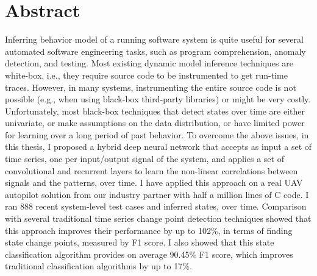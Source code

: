 
\chapter{Abstract}
Inferring behavior model of a running software system is quite useful for several automated software engineering tasks, such as program comprehension, anomaly detection, and testing. Most existing dynamic model inference techniques are white-box, i.e., they require source code to be instrumented to get run-time traces. However, in many systems, instrumenting the entire source code is not possible (e.g., when using black-box third-party libraries) or might be very costly. %
Unfortunately, most black-box techniques that detect states over time are either univariate, or make assumptions on the data distribution, or have limited power for learning over a long period of past behavior. 
To overcome the above issues, in this thesis, I proposed a hybrid deep neural network that accepts as input a set of time series, one per input/output signal of the system, and applies a set of convolutional and recurrent layers to learn the non-linear correlations between signals and the patterns, over time. 
I have applied this approach on a real UAV autopilot solution from our industry partner with half a million lines of C code. 
I ran 888 recent system-level test cases and inferred states, over time. 
Comparison with several traditional time series change point detection techniques showed that this approach improves their performance by up to 102\%, in terms of finding state change points, measured by F1 score. I also showed that this state classification algorithm provides on average 90.45\% F1 score, which improves traditional classification algorithms by up to 17\%.

